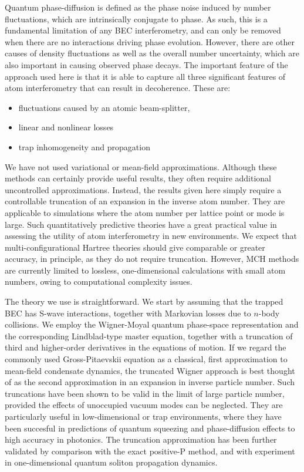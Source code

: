 \documentclass[aps,prl,twocolumn,showpacs,amsmath,amssymb,superscriptaddress]{revtex4-1}
\begin{document}
Quantum phase-diffusion is defined as the phase noise induced by number fluctuations,
which are intrinsically conjugate to phase.
As such, this is a fundamental limitation of any BEC interferometry,
and can only be removed when there are no interactions driving phase evolution.
However, there are other causes of density fluctuations as well as the overall number uncertainty,
which are also important in causing observed phase decays.
The important feature of the approach used here is that it is able to capture
all three significant features of atom interferometry that can result in decoherence.
These are:
\begin{itemize}
\item fluctuations caused by an atomic beam-splitter,
\item linear and nonlinear losses
\item trap inhomogeneity and propagation
\end{itemize}
We have not used variational or mean-field approximations.
Although these methods can certainly provide useful results,
they often require additional uncontrolled approximations.
Instead, the results given here simply require a controllable truncation
of an expansion in the inverse atom number.
They are applicable to simulations where the atom number per lattice point or mode is large.
Such quantitatively predictive theories have a great practical value
in assessing the utility of atom interferometry in new environments.
We expect that multi-configurational Hartree theories should give comparable or greater accuracy,
in principle, as they do not require truncation.
However, MCH methods are currently limited to lossless,
one-dimensional calculations with small atom numbers,
owing to computational complexity issues.

The theory we use is straightforward.
We start by assuming that the trapped BEC has S-wave interactions,
together with Markovian losses due to $n$-body collisions.
We employ the Wigner-Moyal quantum phase-space representation
and the corresponding Lindblad-type master equation,
together with a truncation of third and higher-order derivatives in the equations of motion.
If we regard the commonly used Gross-Pitaevskii equation as a classical,
first approximation to mean-field condensate dynamics,
the truncated Wigner approach is best thought of as the second approximation
in an expansion in inverse particle number.
Such truncations have been shown to be valid in the limit of large particle number,
provided the effects of unoccupied vacuum modes can be neglected.
They are particularly useful in low-dimensional or trap environments,
where they have been succesful in predictions of quantum squeezing
and phase-diffusion effects to high accuracy in photonics.
The truncation approximation has been further validated by comparison
with the exact positive-P method,
and with experiment in one-dimensional quantum soliton propagation dynamics.
\end{document}
